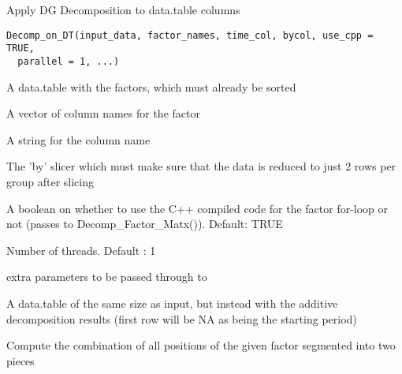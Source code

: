 \documentclass[a4paper]{book}
\begin{document}
%
\begin{Description}\relax
Apply DG Decomposition to data.table columns
\end{Description}
%
\begin{Usage}
\begin{verbatim}
Decomp_on_DT(input_data, factor_names, time_col, bycol, use_cpp = TRUE,
  parallel = 1, ...)
\end{verbatim}
\end{Usage}
%
\begin{Arguments}
\begin{ldescription}
\item[\code{input\_data}] A data.table with the factors, which must already
be sorted

\item[\code{factor\_names}] A vector of column names for the factor

\item[\code{time\_col}] A string for the column name

\item[\code{bycol}] The 'by' slicer which must make sure that the data is
reduced to just 2 rows per group after slicing

\item[\code{use\_cpp}] A boolean on whether to use the C++ compiled code for the
factor for-loop or not (passes to Decomp\_Factor\_Matx()). Default: TRUE

\item[\code{parallel}] Number of threads. Default : 1

\item[\code{...}] extra parameters to be passed through 
to 
\end{ldescription}
\end{Arguments}
%
\begin{Value}
A data.table of the same size as input, but instead with
the additive decomposition results (first row will be NA as being the
starting period)
\end{Value}
%
\begin{Description}\relax
Compute the combination of all positions of the given factor
segmented into two pieces
\end{Description}
\end{document}
